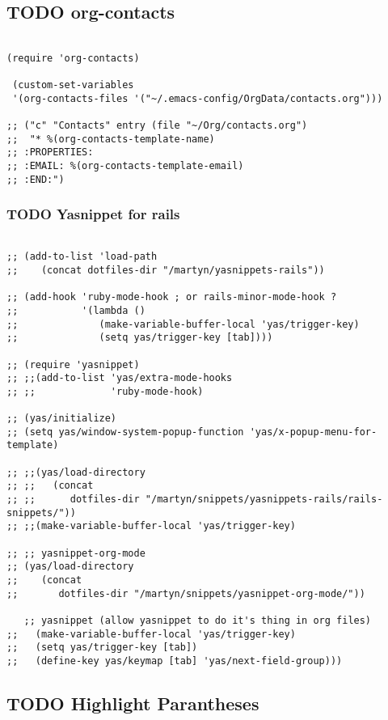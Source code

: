 \documentclass[colorlinks=true,urlcolor=blue,listings-sv]{article}
\begin{document}
{{{\subsection{\textbf{TODO} org-contacts}
\label{sec-2-37}



\lstset{language=Lisp}
\begin{lstlisting}

(require 'org-contacts)

 (custom-set-variables
 '(org-contacts-files '("~/.emacs-config/OrgData/contacts.org")))

;; ("c" "Contacts" entry (file "~/Org/contacts.org")
;;  "* %(org-contacts-template-name)
;; :PROPERTIES:
;; :EMAIL: %(org-contacts-template-email)
;; :END:")
\end{lstlisting}
\subsubsection{\textbf{TODO} Yasnippet for rails}
\label{sec-2-37-1}



\lstset{language=Lisp}
\begin{lstlisting}

;; (add-to-list 'load-path
;;    (concat dotfiles-dir "/martyn/yasnippets-rails"))

;; (add-hook 'ruby-mode-hook ; or rails-minor-mode-hook ?
;;           '(lambda ()
;;              (make-variable-buffer-local 'yas/trigger-key)
;;              (setq yas/trigger-key [tab])))

;; (require 'yasnippet)
;; ;;(add-to-list 'yas/extra-mode-hooks
;; ;;             'ruby-mode-hook)

;; (yas/initialize)
;; (setq yas/window-system-popup-function 'yas/x-popup-menu-for-template)

;; ;;(yas/load-directory
;; ;;   (concat
;; ;;      dotfiles-dir "/martyn/snippets/yasnippets-rails/rails-snippets/"))
;; ;;(make-variable-buffer-local 'yas/trigger-key)

;; ;; yasnippet-org-mode
;; (yas/load-directory
;;    (concat
;;       dotfiles-dir "/martyn/snippets/yasnippet-org-mode/"))

   ;; yasnippet (allow yasnippet to do it's thing in org files)
;;   (make-variable-buffer-local 'yas/trigger-key)
;;   (setq yas/trigger-key [tab])
;;   (define-key yas/keymap [tab] 'yas/next-field-group)))
\end{lstlisting}
\subsection{\textbf{TODO} Highlight Parantheses}
\label{sec-2-38}
}}}
\end{document}
